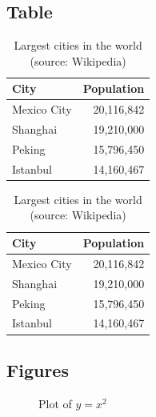 \documentclass[
14pt,notheorems,hyperref={pdfauthor=whatever}
]{beamer}
\begin{document}
\subsection{Table}
\begin{frame}
    \begin{table}
        \caption{Largest cities in the world (source: Wikipedia)}
        \begin{tabular}{@{} lr @{}}
          \toprule
          City & Population\\
          \midrule
          Mexico City & 20,116,842\\
          Shanghai & 19,210,000\\
          Peking & 15,796,450\\
          Istanbul & 14,160,467\\
          \bottomrule
        \end{tabular}
        \hspace*{1cm}
            \setlength\extrarowheight{3pt}
        \begin{tabular}{|lr|}
          \hline
          \rowcolor{primary}\color{white}City & \color{white}Population\\
          \hline
          Mexico City & 20,116,842\\
          Shanghai & 19,210,000\\
          Peking & 15,796,450\\
          Istanbul & 14,160,467\\
          \hline
        \end{tabular}
    \end{table}
\end{frame}

\subsection{Figures}
\begin{frame}
    \begin{figure}[htbp]
        \centering
        \caption{Plot of $y=x^2$}
    \end{figure}

\end{frame}
\end{document}
